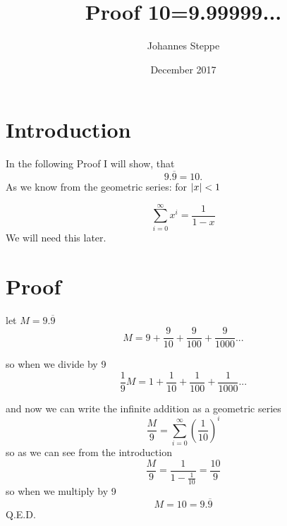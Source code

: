 \documentclass{article}
\title{Proof 10=9.99999...}
\author{Johannes Steppe}
\date{December 2017}
\DeclarePairedDelimiter{\abs}{\lvert}{\rvert}
\begin{document}
\maketitle

\section{Introduction}
In the following Proof I will show, that \[9.\overline{9}=10.\]
\newline
\newline As we know from the geometric series:
for    \(     \abs{x} <1\) 

\[
{\displaystyle \sum_{i=0}^{\infty}}{x^i}=\frac{1}{1-x}
\]
We will need this later.
\section{Proof}



let  $M=9.\overline{9}$
\[M=9+\frac{9}{10}+\frac{9}{100}+\frac{9}{1000}...\]

so when we divide by 9\[\frac{1}{9}M=1+\frac{1}{10}+\frac{1}{100}+\frac{1}{1000}...\]

and now we can write the infinite addition as a geometric series\[
\frac{M}{9}=\sum_{i=0}^{\infty}{\left(\frac{1}{10}\right)^i}
\]
so as we can see from the introduction
\[\frac{M}{9}=\frac{1}{1-\frac{1}{10}}=\frac{10}{9}\]
so when we multiply by 9\[M=10=9.\overline{9}\]
Q.E.D.
\end{document}
